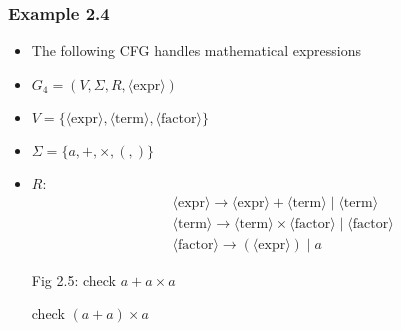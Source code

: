 




\begin{frame}[allowframebreaks] \frametitle{Example 2.4}
  \begin{itemize}
  \item The following CFG handles mathematical expressions
\item $G_4=
(V, \Sigma, R, \langle \text{expr}\rangle)$

\item [] $V=\{\langle \text{expr}\rangle,\langle \text{term}\rangle,\langle \text{factor}\rangle\}
$

\item [] $\Sigma=\{a,+,\times,(,)\}$
\item [] $R$:
\begin{eqnarray*}
&& \langle \text{expr}\rangle \rightarrow \langle \text{expr}\rangle+\langle \text{term}\rangle\mid\langle \text{term}\rangle\\
&& \langle \text{term}\rangle  \rightarrow \langle \text{term}\rangle\times\langle \text{factor}\rangle\mid 
\langle \text{factor}\rangle\\
&& \langle \text{factor}\rangle\rightarrow (\langle \text{expr}\rangle)\mid a
\end{eqnarray*}

Fig 2.5: check
$a+a\times a$

\framebreak


check $(a+a) \times a$


\end{itemize}
\end{frame}
